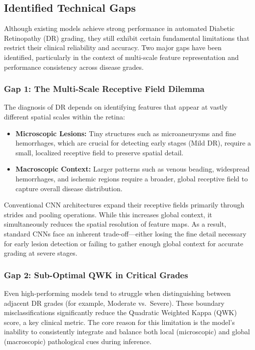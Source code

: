 \documentclass[12pt,a4paper]{article}
\begin{document}
\subsection{Identified Technical Gaps}
Although existing models achieve strong performance in automated Diabetic Retinopathy (DR) grading, they still exhibit certain fundamental limitations that restrict their clinical reliability and accuracy. Two major gaps have been identified, particularly in the context of multi-scale feature representation and performance consistency across disease grades.

\subsubsection{Gap 1: The Multi-Scale Receptive Field Dilemma}
The diagnosis of DR depends on identifying features that appear at vastly different spatial scales within the retina:
\begin{itemize}
    \item \textbf{Microscopic Lesions:} Tiny structures such as microaneurysms and fine hemorrhages, which are crucial for detecting early stages (Mild DR), require a small, localized receptive field to preserve spatial detail.
    \item \textbf{Macroscopic Context:} Larger patterns such as venous beading, widespread hemorrhages, and ischemic regions require a broader, global receptive field to capture overall disease distribution.
\end{itemize}

Conventional CNN architectures expand their receptive fields primarily through strides and pooling operations. While this increases global context, it simultaneously reduces the spatial resolution of feature maps. As a result, standard CNNs face an inherent trade-off—either losing the fine detail necessary for early lesion detection or failing to gather enough global context for accurate grading at severe stages.

\subsubsection{Gap 2: Sub-Optimal QWK in Critical Grades}
Even high-performing models tend to struggle when distinguishing between adjacent DR grades (for example, Moderate vs.\ Severe). These boundary misclassifications significantly reduce the Quadratic Weighted Kappa (QWK) score, a key clinical metric. The core reason for this limitation is the model’s inability to consistently integrate and balance both local (microscopic) and global (macroscopic) pathological cues during inference.
\end{document}
